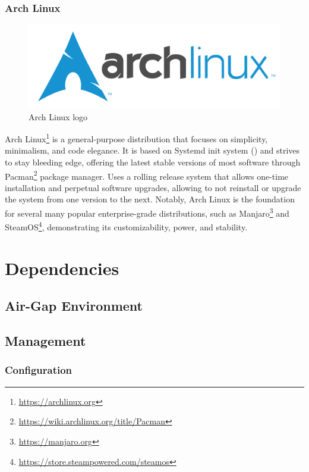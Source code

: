 \subsubsection{Arch Linux}
\label{subsubsec:implementation_distributions_iso_arch_linux}

\begin{figure}
  \centering
  \includegraphics[width=.25\textwidth]{images/logos/arch.png}
  \caption{Arch Linux logo}
\end{figure}

Arch Linux\footnote{\url{https://archlinux.org}} is a general-purpose
distribution that focuses on simplicity, minimalism, and code elegance. It is based
on Systemd init system () %
and strives to stay bleeding edge, offering the latest stable versions of most
software through Pacman\footnote{\url{https://wiki.archlinux.org/title/Pacman}}
package manager. Uses a rolling release system that allows one-time installation
and perpetual software upgrades, allowing to not reinstall or upgrade the system
from one version to the next. Notably, Arch Linux is the foundation for several
many popular enterprise-grade distributions, such as Manjaro\footnote{\url{https://manjaro.org}}
and SteamOS\footnote{\url{https://store.steampowered.com/steamos}},
demonstrating its customizability, power, and stability\cite{arch_linux}.

\section{Dependencies}
\label{sec:implementation_dependencies}


\subsection{Air-Gap Environment}
\label{subsec:implementation_dependencies_air_gap_environment}

\subsection{Management}
\label{subsec:implementation_dependencies_management}

\subsubsection{Configuration}
\label{subsec:implementation_dependencies_management_configuration}

